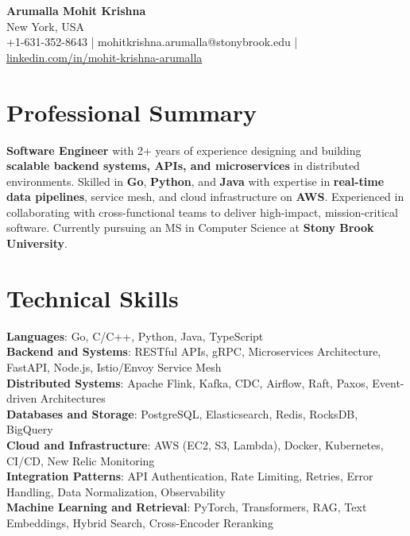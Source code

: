 \documentclass[letterpaper,11pt]{article}
\begin{document}
\begin{center}
  {\Large \textbf{Arumalla Mohit Krishna}} \\
  New York, USA \\
  +1-631-352-8643 \enspace | \enspace mohitkrishna.arumalla@stonybrook.edu \enspace | \enspace \href{https://www.linkedin.com/in/mohit-krishna-arumalla}{linkedin.com/in/mohit-krishna-arumalla}
\end{center}

\section{Professional Summary}
  \begin{itemize}[leftmargin=0.15in, label={}]
    \small{\item{
     \textbf{Software Engineer} with 2+ years of experience designing and building \textbf{scalable backend systems, APIs, and microservices} in distributed environments. Skilled in \textbf{Go}, \textbf{Python}, and \textbf{Java} with expertise in \textbf{real-time data pipelines}, service mesh, and cloud infrastructure on \textbf{AWS}. Experienced in collaborating with cross-functional teams to deliver high-impact, mission-critical software. Currently pursuing an MS in Computer Science at \textbf{Stony Brook University}.
    }}
  \end{itemize}
\vspace{-16pt}

\section{Technical Skills}
 \begin{itemize}[leftmargin=0.15in, label={}]
    \small{\item{
     \textbf{Languages}: Go, C/C++, Python, Java, TypeScript \\
     \textbf{Backend and Systems}: RESTful APIs, gRPC, Microservices Architecture, FastAPI, Node.js, Istio/Envoy Service Mesh \\
     \textbf{Distributed Systems}: Apache Flink, Kafka, CDC, Airflow, Raft, Paxos, Event-driven Architectures \\
     \textbf{Databases and Storage}: PostgreSQL, Elasticsearch, Redis, RocksDB, BigQuery \\
     \textbf{Cloud and Infrastructure}: AWS (EC2, S3, Lambda), Docker, Kubernetes, CI/CD, New Relic Monitoring \\
     \textbf{Integration Patterns}: API Authentication, Rate Limiting, Retries, Error Handling, Data Normalization, Observability \\
     \textbf{Machine Learning and Retrieval}: PyTorch, Transformers, RAG, Text Embeddings, Hybrid Search, Cross-Encoder Reranking
    }}
 \end{itemize}
\vspace{-16pt}
\end{document}
